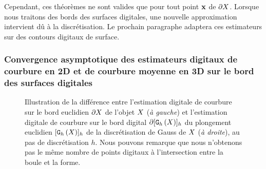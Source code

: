 Cependant, ces théorèmes ne sont valides que pour tout point $\mathbf{x}$ de $\partial X$.
Lorsque nous traitons des bords des surfaces digitales, une nouvelle
approximation intervient dû à la discrétisation. Le prochain paragraphe adaptera
ces estimateurs sur des contours digitaux de surface.
%
\subsubsection{Convergence asymptotique des estimateurs digitaux de courbure en
2D et de courbure moyenne en 3D sur le bord des surfaces digitales}

\begin{figure}[ht]
  \begin{center}
    
  \end{center}
  \caption
  {Illustration de la différence entre l'estimation digitale de courbure sur le
  bord euclidien $\partial X$ de l'objet $X$ (\emph{à gauche}) et l'estimation
  digitale de courbure sur le bord digital $\partial \lbrack \mathtt{G}_{h}\left(X\right) \rbrack_{h}$ du
  plongement euclidien $\lbrack \mathtt{G}_{h}\left(X\right) \rbrack_{h}$ de la discrétisation de Gauss de
  $X$ (\emph{à droite}), au pas de discrétisation $h$. Nous pouvons
  remarque que nous n'obtenons pas le même nombre de points digitaux à
  l'intersection entre la boule et la
  forme.\label{fig:2d-curv-estimator-xhat}}
\end{figure}

